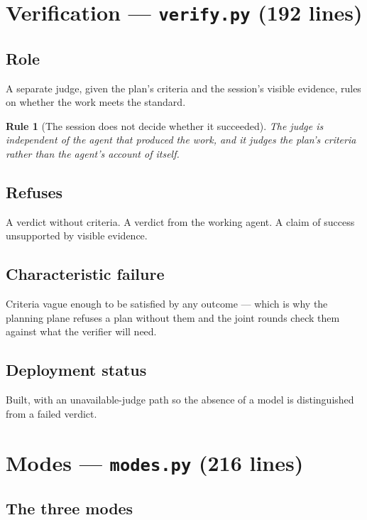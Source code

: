 \documentclass[11pt]{article}
\newtheorem{drule}{Rule}
\newcommand{\code}[1]{\texttt{\small #1}}
\begin{document}
\section{Verification --- \code{verify.py} (192 lines)}
\label{sec:verify}

\subsection{Role}

A separate judge, given the plan's criteria and the session's visible evidence, rules on whether the work meets the standard.

\begin{drule}[The session does not decide whether it succeeded]
\label{rule:noselfverify}
The judge is independent of the agent that produced the work, and it judges the plan's criteria rather than the agent's account of itself.
\end{drule}

\subsection{Refuses}

A verdict without criteria. A verdict from the working agent. A claim of success unsupported by visible evidence.

\subsection{Characteristic failure}

Criteria vague enough to be satisfied by any outcome --- which is why the planning plane refuses a plan without them and the joint rounds check them against what the verifier will need.

\subsection{Deployment status}

Built, with an unavailable-judge path so the absence of a model is distinguished from a failed verdict.

\section{Modes --- \code{modes.py} (216 lines)}
\label{sec:modes}

\subsection{The three modes}
\end{document}
